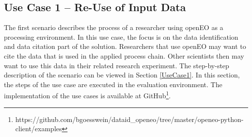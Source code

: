 \documentclass[draft,final]{vutinfth} %
\begin{document}
\subsection{Use Case 1 – Re-Use of Input Data}\label{Implementation:Use Case1}
The first scenario describes the process of a researcher using openEO as a processing environment. In this use case, the focus is on the data identification and data citation part of the solution. Researchers that use openEO may want to cite the data that is used in the applied process chain. Other scientists then may want to use this data in their related research experiment. The step-by-step description of the scenario can be viewed in Section \ref{UseCase1}. In this section, the steps of the use case are executed in the evaluation environment. The implementation of the use cases is available at GitHub\footnote{https://github.com/bgoesswein/dataid\_openeo/tree/master/openeo-python-client/examples}.
\end{document}
